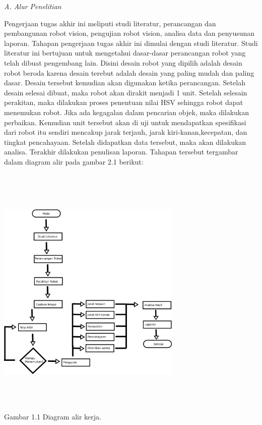 \documentclass[10pt,journal,compsoc]{IEEEtran}
\begin{document}
  \noindent \textit{A. Alur Penelitian}
  
  Pengerjaan tugas akhir ini meliputi studi literatur, perancangan dan pembangunan robot vision, pengujian robot vision, analisa data dan penyusunan laporan. 
  Tahapan pengerjaan tugas akhir ini dimulai dengan studi literatur. 
  Studi literatur ini bertujuan untuk mengetahui dasar-dasar perancangan robot yang telah dibuat pengembang lain.
  Disini desain robot yang dipilih adalah desain robot beroda karena desain terebut adalah desain yang paling mudah dan paling dasar. 
  Desain tersebut kemudian akan digunakan ketika perancangan. 
  Setelah desain selesai dibuat, maka robot akan dirakit menjadi 1 unit. 
  Setelah selesain perakitan, maka dilakukan proses penentuan nilai HSV sehingga robot dapat menemukan robot. 
  Jika ada kegagalan dalam pencarian objek, maka dilakukan perbaikan. 
  Kemudian unit tersebut akan di uji untuk mendapatkan spesifikasi dari robot itu sendiri mencakup jarak terjauh, jarak kiri-kanan,kecepatan, dan tingkat pencahayaan. 
  Setelah didapatkan data tersebut, maka akan dilakukan analisa. 
  Terakhir dilakukan penulisan laporan.
  Tahapan tersebut tergambar dalam diagram alir pada gambar 2.1 berikut:
  \begin{center}
    \includegraphics[width=250pt,height=350pt]{work}\\
    Gambar 1.1 Diagram alir kerja.
  \end{center}
  
\end{document}
